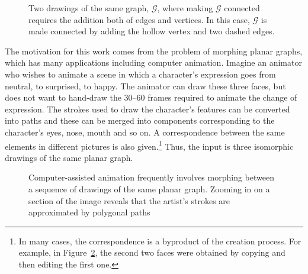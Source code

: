 \documentclass{patmorin}
\begin{document}
\begin{figure}[b]
  \caption{Two drawings of the same graph, $\mathcal{G}$, where making $\mathcal{G}$ connected requires the addition both of edges and vertices. In this case, $\mathcal G$ is made connected by adding the hollow vertex and two dashed edges.}
  \label{fig:bad-example}
\end{figure}

The motivation for this work comes from the problem of morphing
planar graphs, which has many applications \cite{erten.kobourov.ea:intersection,friedrich.eades:graph,gotsman.surazhsky:guaranteed,surazhsky.gotsman:controllable,surazhsky.gotsman:intrinsic} including
computer animation.  Imagine an
animator who wishes to animate a scene in which a character's expression
goes from neutral, to surprised, to happy. The animator can draw these
three faces, but does not want to hand-draw the 30--60 frames required
to animate the change of expression.  The strokes used to draw the
character's features can be converted into paths and these can be merged
into components corresponding to the character's eyes, nose, mouth and
so on.  A correspondence between the same elements in different pictures
is also given.\footnote{In many cases, the correspondence is a byproduct
of the creation process. For example, in Figure~\ref{fig:faces}, the second
two faces were obtained by copying and then editing the first one.}  Thus,
the input is three isomorphic drawings of the same planar graph.

\begin{figure}
  \caption{Computer-assisted animation frequently involves morphing between
   a sequence of drawings of the same planar graph.  Zooming in on a section
   of the image reveals that the artist's strokes are approximated by polygonal
   paths}
  \label{fig:faces}
\end{figure}
\end{document}
